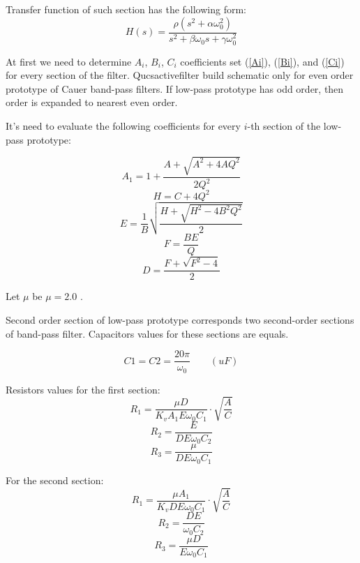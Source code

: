 Transfer function of such section has the following form:
\begin{equation}
 H(s) = \frac{\rho(s^2+\alpha\omega_0^2)}{s^2+\beta\omega_0s+\gamma\omega_0^2}
\end{equation}


At first we need to determine $A_i$, $B_i$, $C_i$ coefficients set (\ref{Ai}), 
(\ref{Bi}), and (\ref{Ci}) for every section of the filter. Qucsactivefilter 
build schematic only for even order prototype of Cauer band-pass filters. If 
low-pass prototype has odd order, then order is expanded to nearest even order.

It's need to evaluate the following coefficients for every $i$-th section of 
the low-pass prototype:

\begin{equation}
 A_1 = 1+\frac{A+\sqrt{A^2+4AQ^2}}{2Q^2}
\end{equation}
\begin{equation}
 H=C+4Q^2
\end{equation}
\begin{equation}
 E=\frac{1}{B}\sqrt{\frac{H+\sqrt{H^2-4B^2Q^2}}{2}}
\end{equation}
\begin{equation}
 F=\frac{BE}{Q}
\end{equation}
\begin{equation}
 D=\frac{F+\sqrt{F^2-4}}{2}
\end{equation}

Let $\mu$ be $\mu=2.0$ \cite{johnson}.

Second order section of low-pass prototype corresponds two second-order 
sections of band-pass filter. Capacitors values for these sections are equals. 

\begin{equation}
 C1 = C2 = \frac{20\pi}{\omega_0} \qquad (uF) \label{eq:C1_C2_bpf}
\end{equation}

Resistors values for the first section:
\begin{equation}
 R_1= \frac{\mu D}{K_v A_1 E \omega_0 C_1}\cdot\sqrt{\frac{A}{C}}
\end{equation}
\begin{equation}
 R_2=\frac{E}{DE\omega_0 C_2}
\end{equation}
\begin{equation}
 R_3=\frac{\mu}{DE\omega_0 C_1}
\end{equation}

For the second section:
\begin{equation}
 R_1= \frac{\mu A_1}{K_v D E \omega_0 C_1}\cdot\sqrt{\frac{A}{C}}
\end{equation}
\begin{equation}
 R_2=\frac{DE}{\omega_0 C_2}
\end{equation}
\begin{equation}
 R_3=\frac{\mu D}{E\omega_0 C_1}
\end{equation}

